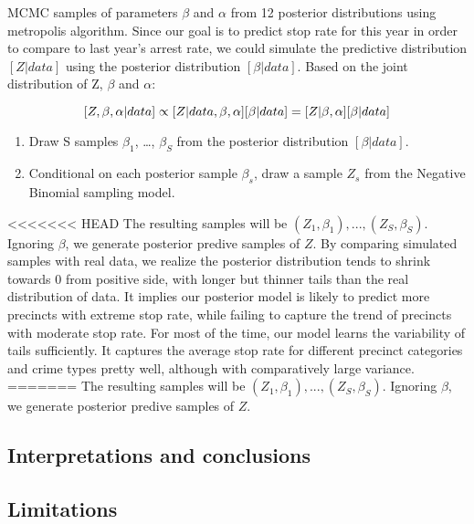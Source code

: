 \documentclass[]{article}
\providecommand{\tightlist}{%
  \setlength{\itemsep}{0pt}\setlength{\parskip}{0pt}}
\begin{document}
MCMC samples of parameters \(\beta\) and \(\alpha\) from 12 posterior
distributions using metropolis algorithm. Since our goal is to predict
stop rate for this year in order to compare to last year's arrest rate,
we could simulate the predictive distribution \([Z|data]\) using the
posterior distribution \([\beta|data]\). Based on the joint distribution
of Z, \(\beta\) and \(\alpha\):

\[
[Z, \beta, \alpha|data] \propto [Z|data, \beta, \alpha][\beta|data]\\
=[Z|\beta, \alpha][\beta|data]
\]

\begin{enumerate}
\def\labelenumi{\arabic{enumi}.}
\tightlist
\item
  Draw S samples \(\beta_1\), \ldots{}, \(\beta_S\) from the posterior
  distribution \([\beta|data]\).
\item
  Conditional on each posterior sample \(\beta_s\), draw a sample
  \(Z_s\) from the Negative Binomial sampling model.
\end{enumerate}

\textless{}\textless{}\textless{}\textless{}\textless{}\textless{}\textless{}
HEAD The resulting samples will be
\((Z_1, \beta_1), ..., (Z_S, \beta_S)\). Ignoring \(\beta\), we generate
posterior predive samples of \(Z\). By comparing simulated samples with
real data, we realize the posterior distribution tends to shrink towards
0 from positive side, with longer but thinner tails than the real
distribution of data. It implies our posterior model is likely to
predict more precincts with extreme stop rate, while failing to capture
the trend of precincts with moderate stop rate. For most of the time,
our model learns the variability of tails sufficiently. It captures the
average stop rate for different precinct categories and crime types
pretty well, although with comparatively large variance. ======= The
resulting samples will be \((Z_1, \beta_1), ..., (Z_S, \beta_S)\).
Ignoring \(\beta\), we generate posterior predive samples of \(Z\).

\hypertarget{interpretations-and-conclusions}{%
\subsection{Interpretations and
conclusions}\label{interpretations-and-conclusions}}

\hypertarget{limitations}{%
\subsection{Limitations}\label{limitations}}
\end{document}
